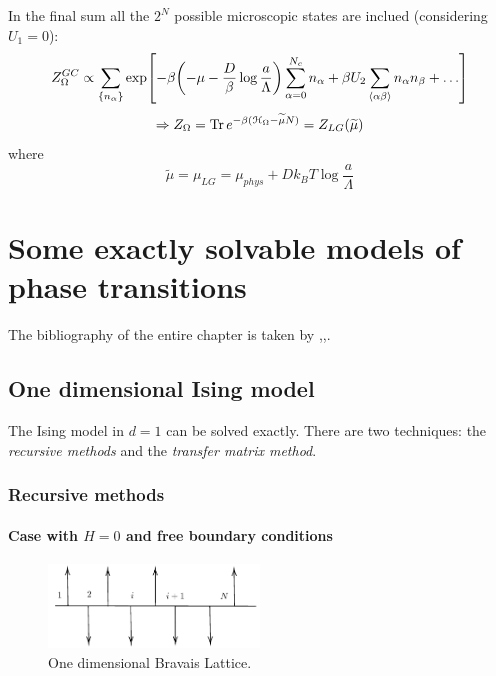 \documentclass[../main/main.tex]{subfiles}
\begin{document}
\begin{remark}
In the final sum all the \( 2^N \) possible microscopic states are inclued (considering \( U_1 =0 \)):
\begin{equation}
  Z_ \Omega ^{GC} \propto  \sum_{\{ n_ \alpha  \}} \exp [-\beta \qty(-\mu - \frac{D}{\beta } \log{\frac{a}{\Lambda }} ) \sum_{\alpha =0}^{N_c} n_ \alpha  + \beta U_2 \sum_{\expval{\alpha \beta } }^{} n_ \alpha n_ \beta + \dots     ]
\end{equation}
\begin{equation}
  \Rightarrow Z_ \Omega = \Tr e^{-\beta ( \mathcal{H}_ \Omega - \widetilde{\mu} N )} = Z_{LG} ( \widetilde{\mu } )
\end{equation}
where
\begin{equation}
  \widetilde{\mu } = \mu _{LG} = \mu _{phys} + D k_B T \log{\frac{a}{\Lambda }}
\end{equation}
\end{remark}




\chapter{Some exactly solvable models of phase transitions}

The bibliography of the entire chapter is taken by \cite{9_lesson_1},\cite{9_lesson_2},\cite{9_lesson_3}.


\section{One dimensional Ising model}
The Ising model in \( d=1 \) can be solved exactly. There are two techniques: the \emph{recursive methods} and the \emph{transfer matrix method}.

\subsection{Recursive methods}

\subsubsection{Case with \( H=0 \) and free boundary conditions}

\begin{figure}[h!]
\centering
\includegraphics[width=0.5\textwidth]{../lessons/6_image/2.pdf}
\caption{\label{fig:6_2} One dimensional Bravais Lattice.}
\end{figure}
\end{document}
